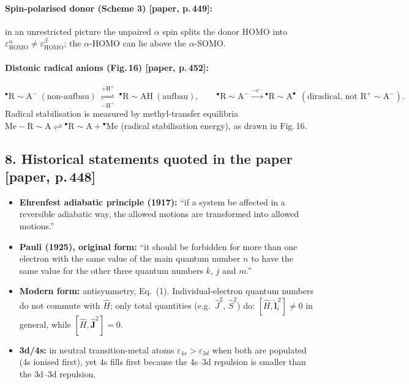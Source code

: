 \paragraph{Spin-polarised donor (Scheme 3) [paper, p.\,449]:} in an unrestricted picture the
unpaired $\alpha$ spin splits the donor HOMO into $\varepsilon^\alpha_{\text{HOMO}} \ne
\varepsilon^\beta_{\text{HOMO}}$; the $\alpha$-HOMO can lie above the $\alpha$-SOMO.

\paragraph{Distonic radical anions (Fig.\,16) [paper, p.\,452]:}
\begin{equation}
  {}^{\bullet}\mathrm{R}\!\sim\!\mathrm{A}^{-}\ (\text{non-aufbau})
  \;\underset{-\mathrm{H}^+}{\overset{+\mathrm{H}^+}{\rightleftharpoons}}\;
  {}^{\bullet}\mathrm{R}\!\sim\!\mathrm{AH}\ (\text{aufbau}),\qquad
  {}^{\bullet}\mathrm{R}\!\sim\!\mathrm{A}^{-} \xrightarrow{-e^-} {}^{\bullet}\mathrm{R}\!\sim\!\mathrm{A}^{\bullet}
  \ \ (\text{diradical, not } \mathrm{R}^+\!\sim\!\mathrm{A}^-).
\end{equation}
Radical stabilisation is measured by methyl-transfer equilibria
$\mathrm{Me{-}R}\!\sim\!\mathrm{A} \rightleftharpoons {}^\bullet\mathrm{R}\!\sim\!\mathrm{A} + {}^\bullet\mathrm{Me}$
(radical stabilisation energy), as drawn in Fig.\,16.

\subsection*{8. Historical statements quoted in the paper [paper, p.\,448]}
\begin{itemize}
  \item \textbf{Ehrenfest adiabatic principle (1917):} ``if a system be affected in a reversible
        adiabatic way, the allowed motions are transformed into allowed motions.''
  \item \textbf{Pauli (1925), original form:} ``it should be forbidden for more than one electron
        with the same value of the main quantum number $n$ to have the same value for the other
        three quantum numbers $k$, $j$ and $m$.''
  \item \textbf{Modern form:} antisymmetry, Eq.~(1). Individual-electron quantum numbers do not
        commute with $\hat H$; only total quantities (e.g.\ $\hat{J}^2$, $\hat{S}^2$) do:
        $[\hat H,\hat{\mathbf{l}}_i^{\,2}]\neq0$ in general, while $[\hat H,\hat{\mathbf J}^2]=0$.
  \item \textbf{3d/4s:} in neutral transition-metal atoms $\varepsilon_{4s} > \varepsilon_{3d}$ when
        both are populated (4s ionised first), yet 4s fills first because the 4s--3d repulsion is
        smaller than the 3d--3d repulsion.
\end{itemize}

